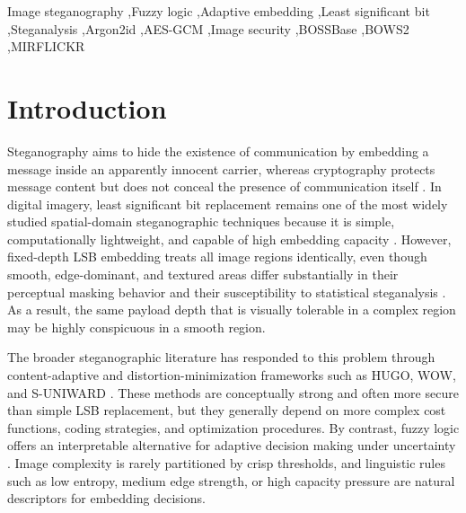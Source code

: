 \begin{frontmatter}
\begin{abstract}
The adaptive approach consistently achieves approximately 3 dB PSNR advantage over Fixed-LSB-1 and approximately 7 dB over Fixed-LSB-2 across all four tested datasets, demonstrating that this quality benefit is stable under diverse image content. On MIRFLICKR, the adaptive method achieves a SRM-lite AUC of 0.565 at 0.05 bpp --- practically indistinguishable from a random classifier (AUC~=~0.5) --- representing the strongest steganalytic evasion result across all datasets. The results demonstrate that fuzzy depth control is an effective and interpretable mechanism for improving the quality-security trade-off in spatial-domain steganography, while also clarifying the limitations of adaptive LSB designs against stronger modern steganalysis.
\end{abstract}

\begin{keyword}
Image steganography \sep Fuzzy logic \sep Adaptive embedding \sep Least significant bit \sep Steganalysis \sep Argon2id \sep AES-GCM \sep Image security \sep BOSSBase \sep BOWS2 \sep MIRFLICKR
\end{keyword}

\end{frontmatter}

\section{Introduction}
Steganography aims to hide the existence of communication by embedding a message inside an apparently innocent carrier, whereas cryptography protects message content but does not conceal the presence of communication itself \cite{cheddad2010,cox2007,fridrich2009book}. In digital imagery, least significant bit replacement remains one of the most widely studied spatial-domain steganographic techniques because it is simple, computationally lightweight, and capable of high embedding capacity \cite{bender1996,chan2004,hussain2018}. However, fixed-depth LSB embedding treats all image regions identically, even though smooth, edge-dominant, and textured areas differ substantially in their perceptual masking behavior and their susceptibility to statistical steganalysis \cite{westfeld1999,fridrich2001,dumitrescu2003}. As a result, the same payload depth that is visually tolerable in a complex region may be highly conspicuous in a smooth region.

The broader steganographic literature has responded to this problem through content-adaptive and distortion-minimization frameworks such as HUGO, WOW, and S-UNIWARD \cite{pevny2010,filler2011,holub2012,holub2014}. These methods are conceptually strong and often more secure than simple LSB replacement, but they generally depend on more complex cost functions, coding strategies, and optimization procedures. By contrast, fuzzy logic offers an interpretable alternative for adaptive decision making under uncertainty \cite{zadeh1965,mamdani1975,ross2010}. Image complexity is rarely partitioned by crisp thresholds, and linguistic rules such as low entropy, medium edge strength, or high capacity pressure are natural descriptors for embedding decisions.

